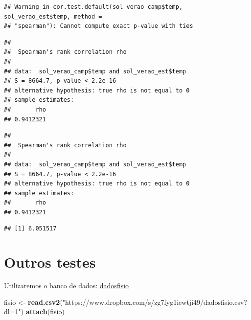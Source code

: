 \documentclass[
]{book}
\newenvironment{Shaded}{\begin{snugshade}}{\end{snugshade}}
\newcommand{\DataTypeTok}[1]{\textcolor[rgb]{0.13,0.29,0.53}{#1}}
\newcommand{\KeywordTok}[1]{\textcolor[rgb]{0.13,0.29,0.53}{\textbf{#1}}}
\newcommand{\NormalTok}[1]{#1}
\newcommand{\OperatorTok}[1]{\textcolor[rgb]{0.81,0.36,0.00}{\textbf{#1}}}
\newcommand{\StringTok}[1]{\textcolor[rgb]{0.31,0.60,0.02}{#1}}
\begin{document}
\begin{verbatim}
## Warning in cor.test.default(sol_verao_camp$temp, sol_verao_est$temp, method =
## "spearman"): Cannot compute exact p-value with ties
\end{verbatim}

\begin{verbatim}
## 
##  Spearman's rank correlation rho
## 
## data:  sol_verao_camp$temp and sol_verao_est$temp
## S = 8664.7, p-value < 2.2e-16
## alternative hypothesis: true rho is not equal to 0
## sample estimates:
##       rho 
## 0.9412321
\end{verbatim}

\begin{Shaded}
\end{Shaded}

\begin{verbatim}
## 
##  Spearman's rank correlation rho
## 
## data:  sol_verao_camp$temp and sol_verao_est$temp
## S = 8664.7, p-value < 2.2e-16
## alternative hypothesis: true rho is not equal to 0
## sample estimates:
##       rho 
## 0.9412321
\end{verbatim}

\begin{Shaded}
\end{Shaded}

\begin{verbatim}
## [1] 6.051517
\end{verbatim}

\hypertarget{outros-testes}{%
\section{Outros testes}\label{outros-testes}}

Utilizaremos o banco de dados: \href{https://www.dropbox.com/s/zg7fyg1iewtji49/dadosfisio.csv?dl=0}{dadosfisio}

\begin{Shaded}
\begin{Highlighting}[]
\NormalTok{fisio <-}\StringTok{ }\KeywordTok{read.csv2}\NormalTok{(}\StringTok{"https://www.dropbox.com/s/zg7fyg1iewtji49/dadosfisio.csv?dl=1"}\NormalTok{)}
\KeywordTok{attach}\NormalTok{(fisio)}
\end{Highlighting}
\end{Shaded}
\end{document}
